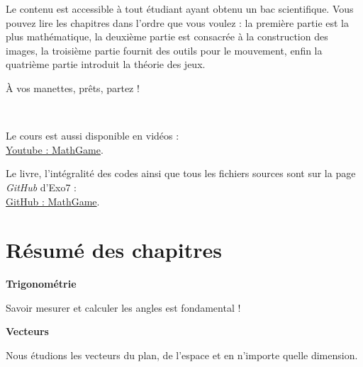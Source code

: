 \medskip

Le contenu est accessible à tout étudiant ayant obtenu un bac scientifique. Vous pouvez lire les chapitres dans l'ordre que vous voulez : la première partie est la plus mathématique, la deuxième partie est consacrée à la construction des images, la troisième partie fournit des outils pour le mouvement, enfin la quatrième partie introduit la théorie des jeux.

\medskip

À vos manettes, prêts, partez !
  

~
\bigskip
\vfill
\begin{center}
Le cours est aussi disponible en vidéos :\\
\href{https://www.youtube.com/@MathGame-Exo7}{Youtube : \og{}MathGame\fg{}}.    
    
Le livre, l'intégralité des codes ainsi que tous les fichiers sources sont sur la page \emph{GitHub} d'Exo7 :\\
\href{https://github.com/exo7math/mathgame-exo7}{\og{}GitHub : MathGame\fg{}}.
\end{center}
\vfill




\cleardoublepage
\thispagestyle{empty}
\tableofcontents

\cleardoublepage
\section*{Résumé des chapitres}


\newcommand{\titrechapitre}[1]{{\textbf{#1}}\nopagebreak}
\newcommand{\descriptionchapitre}[1]{%
\smallskip\hfill
\begin{minipage}{0.95\textwidth}\small#1\end{minipage}\medskip\smallskip}





\titrechapitre{Trigonométrie}

\descriptionchapitre{Savoir mesurer et calculer les angles est fondamental !}


\titrechapitre{Vecteurs}

\descriptionchapitre{Nous étudions les vecteurs du plan, de l'espace et en n'importe quelle dimension.}


